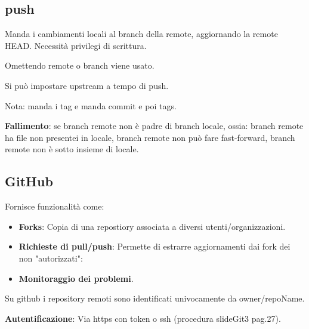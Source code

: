 \subsection{push}
Manda i cambiamenti locali al branch della remote, aggiornando la remote HEAD. Necessità privilegi di scrittura.


Omettendo remote o branch viene usato.


Si può impostare upstream a tempo di push.


Nota:  manda i tag e  manda commit e poi tags.

\bigskip

\textbf{Fallimento}: se branch remote non è padre di branch locale, ossia: branch remote ha file non presentei in locale, branch remote non può fare fast-forward, branch remote non è sotto insieme di locale.

\subsection{GitHub}
Fornisce funzionalità come:
\begin{itemize}
	\item \textbf{Forks}: Copia di una repostiory associata a diversi utenti/organizzazioni.
	\item \textbf{Richieste di pull/push}: Permette di estrarre aggiornamenti dai fork dei non "autorizzati":
	\item \textbf{Monitoraggio dei problemi}.
\end{itemize}

Su github i repository remoti sono identificati univocamente da owner/repoName.

\textbf{Autentificazione}: Via https con token o ssh (procedura slideGit3 pag.27).